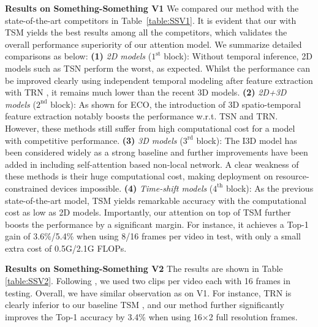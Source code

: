 \documentclass[runningheads]{llncs}
\newcommand{\keypoint}[1]{\vspace{0.1cm}\noindent\textbf{#1}\quad}
\begin{document}
\keypoint{Results on Something-Something V1} 
We compared our \shortname{} method with the state-of-the-art competitors in Table~\ref{table:SSV1}.
It is evident that our \shortname{} with TSM \cite{lin2019tsm} yields the best results among all the competitors, which validates the overall performance superiority of our attention model.
We summarize detailed comparisons as below:
{\bf (1)} {\em 2D models} ($1^\text{st}$ block):
Without temporal inference, 2D models such as TSN \cite{wang2016temporal} perform the worst, as expected. Whilst the performance can be
improved clearly using independent temporal modeling after feature extraction with TRN \cite{zhou2018temporal}, it remains much lower than the recent 3D models.
{\bf (2)} {\em 2D+3D models} ($2^\text{nd}$ block):
As shown for ECO, the introduction of 3D spatio-temporal feature extraction notably boosts the performance w.r.t. TSN and TRN.
However, these methods still suffer from high computational cost for a model with competitive performance.
{\bf (3)} {\em 3D models} ($3^\text{rd}$ block):
The I3D model \cite{carreira2017quo} has been considered widely as a strong baseline and further improvements have been added in \cite{feichtenhofer2019slowfast,wang2018non,wang2018videos} including self-attention based non-local network. 
A clear weakness of these methods
is their huge computational cost, making deployment on resource-constrained devices impossible.
{\bf (4)} {\em Time-shift models} ($4^\text{th}$ block): As the previous state-of-the-art model, TSM \cite{lin2019tsm} yields remarkable accuracy with the computational cost as low as 2D models. 
Importantly, our \shortname{} attention on top of TSM 
further boosts the performance by a significant margin.
For instance, it
achieves a Top-1 gain of 3.6\%/5.4\% when using 8/16 frames per video in test, with only a small extra cost of 0.5G/2.1G FLOPs.







\keypoint{Results on Something-Something V2}
The results are shown  in Table \ref{table:SSV2}.
Following \cite{lin2019tsm},
we used two clips per video each with 16 frames
in testing.
Overall, we have similar observation as on V1.
For instance, TRN \cite{zhou2018temporal} is clearly inferior to our baseline TSM \cite{lin2019tsm}, and our method further significantly improves the Top-1 accuracy by 3.4\% when using 16$\times$2 full resolution frames. 
\end{document}
